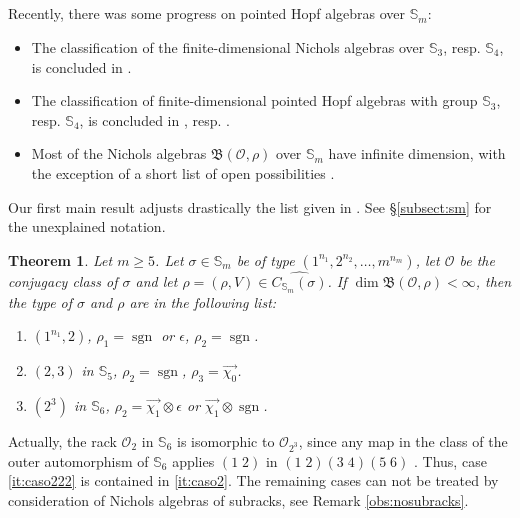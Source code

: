 \documentclass[11pt]{amsart} \textheight 22cm
\renewcommand{\^}[1]{\mbox{$^{\left( #1 \right)}$}}
\renewcommand{\_}[1]{\mbox{$_{\left( #1 \right)}$}}
\newcommand\toba{{\mathfrak B }}
\newcommand{\ku}{\mathbb C}
\newcommand{\G}{{\mathbb G}}
\newcommand{\Oc}{{\mathcal O}}
\newcommand{\oc}{{\mathcal O}}
\newcommand\sgn{\operatorname{sgn}}
\theoremstyle{plain}
\newtheorem{theorem}[lema]{Theorem}
\theoremstyle{definition}
\theoremstyle{remark}
\newcommand\st{\mathbb S_3}
\newcommand\sk{\mathbb S_4}
\newcommand\sco{\mathbb S_5}
\newcommand\sm{\mathbb S_m}
\newcommand\sei{\mathbb S_6}
\newcommand\s{\mathbb S}
\theoremstyle{remark}
\begin{document}
\medbreak\subsection{} Recently, there was some progress on
pointed Hopf algebras over $\sm$:
\begin{itemize}
    \item The classification of the finite-dimensional Nichols algebras over
        $\st$, resp. $\sk$, is concluded in \cite{AHS}.
    \item The classification of finite-dimensional pointed Hopf algebras with
        group $\st$, resp.  $\sk$, is concluded in \cite{AHS}, resp. \cite{GG}.
    \item Most of the Nichols algebras $\toba(\Oc, \rho)$ over $\sm$ have infinite
        dimension, with the exception of a short list of open possibilities \cite{AF1, afz}.
\end{itemize}


Our first main result adjusts drastically the list given in \cite[Th. 1]{afz}. See \S\ref{subsect:sm} for the
unexplained notation.

\begin{theorem}\label{th:sm-intro}
    Let $m\ge 5$.  Let $\sigma\in \mathbb S_m$ be of type $(1^{n_1},2^{n_2},\dots,m^{n_m})$,
    let $\Oc$ be the conjugacy class of $\sigma$ and let $\rho=(\rho,V) \in
    \widehat{C_{\mathbb S_m}(\sigma)}$. If $\dim\toba(\Oc, \rho) < \infty$, then
    the type of $\sigma$ and $\rho$ are in the following list:
    \renewcommand{\theenumi}{\roman{enumi}}\renewcommand{\labelenumi}{(\theenumi)}
    \begin{enumerate}
        \item\label{it:caso2}
            $(1^{n_1}, 2)$, $\rho_1 =\sgn$ or $\epsilon$, $\rho_2 =\sgn$.
        \item
            $(2, 3)$ in $\sco$, $\rho_2 =\sgn$, $\rho_3= \overrightarrow{\chi_{0}}$.
        \item\label{it:caso222}
            $(2^3)$ in $\sei$, $\rho_2=\overrightarrow{\chi_{1}}\otimes\epsilon$ or
            $\overrightarrow{\chi_{1}}\otimes \sgn$.
    \end{enumerate}
\end{theorem}
Actually, the rack $\oc_2$ in $\s_6$ is isomorphic to $\oc_{2^3}$,
since any map in the class of the outer automorphism of $\s_6$
applies $(1\;2)$ in $(1\;2)(3\;4)(5\;6)$ \cite{JR}. Thus, case
\eqref{it:caso222} is contained in \eqref{it:caso2}. The remaining
cases can not be treated by consideration of Nichols algebras of
subracks, see Remark \ref{obs:nosubracks}.
\end{document}
